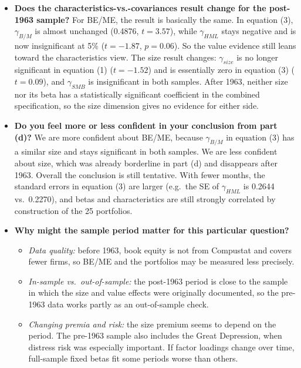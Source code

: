 \documentclass[11pt]{article}
\newenvironment{tight}
  {\begin{itemize}\setlength{\itemsep}{3pt}\setlength{\parskip}{0pt}%
   \setlength{\topsep}{3pt}\setlength{\leftmargini}{1.4em}}
  {\end{itemize}}
\begin{document}
\begin{tight}
  \item \textbf{Does the characteristics-vs.-covariances result change for the post-1963
  sample?} For BE/ME, the result is basically the same. In equation (3), $\gamma_{B/M}$ is
  almost unchanged (0.4876, $t = 3.57$), while $\gamma_{HML}$ stays negative and is now
  insignificant at 5\% ($t = -1.87$, $p = 0.06$). So the value evidence still leans toward
  the characteristics view. The size result changes: $\gamma_{size}$ is no longer
  significant in equation (1) ($t = -1.52$) and is essentially zero in equation (3)
  ($t = 0.09$), and $\gamma_{SMB}$ is insignificant in both samples. After 1963, neither
  size nor its beta has a statistically significant coefficient in the combined
  specification, so the size dimension gives no evidence for either side.
  \item \textbf{Do you feel more or less confident in your conclusion from part (d)?} We
  are more confident about BE/ME, because $\gamma_{B/M}$ in equation (3) has a similar size
  and stays significant in both samples. We are less confident about size, which was
  already borderline in part (d) and disappears after 1963. Overall the conclusion is
  still tentative. With fewer months, the standard errors in equation (3) are larger
  (e.g.\ the SE of $\gamma_{HML}$ is 0.2644 vs.\ 0.2270), and betas and characteristics
  are still strongly correlated by construction of the 25 portfolios.
  \item \textbf{Why might the sample period matter for this particular question?}
  \begin{tight}
    \item \emph{Data quality:} before 1963, book equity is not from Compustat and covers
    fewer firms, so BE/ME and the portfolios may be measured less precisely.
    \item \emph{In-sample vs.\ out-of-sample:} the post-1963 period is close to the sample
    in which the size and value effects were originally documented, so the pre-1963 data
    works partly as an out-of-sample check.
    \item \emph{Changing premia and risk:} the size premium seems to depend on the period.
    The pre-1963 sample also includes the Great Depression, when distress risk was
    especially important. If factor loadings change over time, full-sample fixed betas fit
    some periods worse than others.
  \end{tight}
\end{tight}
\end{document}
